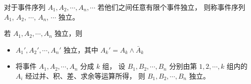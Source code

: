  对于事件序列 $A_1,A_2,\cdots,A_n,\cdots$ 若他们之间任意有限个事件独立，
则称事件序列 $A_1$, $A_2$, $\cdots$, $A_n$, $\cdots$ 独立。

 若 $A_1,A_2,\cdots,A_n$ 独立，则
\begin{itemize}[leftmargin=\subparitemindent]
    \item $A_1',A_2',\cdots,A_n'$ 独立，其中 $A_k' = A_k \wedge \bar{A}_k $
    \item 将事件 $A_1,A_2,\cdots,A_n$ 分成 $k$ 组，
    设 $B_1,B_2,\cdots,B_n$ 分别由第 $1,2,\cdots,k$ 组内的 $A_i$ 经过并、积、差、求余等运算所得，
    则 $B_1,B_2,\cdots,B_n$ 独立。
\end{itemize}
